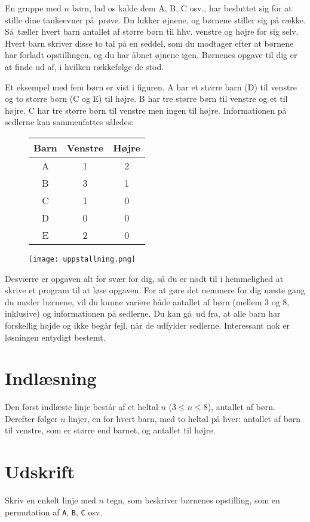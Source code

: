 En gruppe med $n$ børn, lad os kalde dem A, B, C osv., har besluttet sig for at stille dine tankeevner på prøve.
Du lukker øjnene, og børnene stiller sig på række.
Så tæller hvert barn antallet af større børn til hhv. venstre og højre for sig selv.
Hvert barn skriver disse to tal på en seddel, som du modtager efter at børnene har forladt opstillingen, og du har åbnet øjnene igen.
Børnenes opgave til dig er at finde ud af, i hvilken rækkefølge de stod.

Et eksempel med fem børn er vist i figuren.
A har et større barn (D) til venstre og to større børn (C og E) til højre.
B har tre større børn til venstre og et til højre.
C har tre større børn til venstre men ingen til højre. 
Informationen på sedlerne kan sammenfattes således:

\begin{figure}[h!]
  \centering

\begin{minipage}{.5\textwidth}
    \begin{tabular}[b]{|c|c|c|}
    \hline
      Barn&Venstre&Højre\\\hline
      A&1&2\\
      B&3&1\\
      C&1&0\\
      D&0&0\\
      E&2&0\\\hline
    \end{tabular}
\end{minipage}%
\begin{minipage}{.5\textwidth}
    \texttt{[image: uppstallning.png]}
\end{minipage}

\end{figure}

Desværre er opgaven alt for svær for dig, så du er nødt til i hemmelighed at skrive et program til at løse opgaven.
For at gøre det nemmere for dig næste gang du møder børnene, vil du kunne variere både antallet af børn (mellem $3$ og $8$, inklusive) og informationen på sedlerne.
Du kan gå ud fra, at alle barn har forskellig højde og ikke begår fejl, når de udfylder sedlerne.
Interessant nok er løsningen entydigt bestemt.

\section*{Indlæsning}
Den først indlæste linje består af et heltal $n$ ($3 \le n \le 8$), antallet af børn.
Derefter følger $n$ linjer, en for hvert barn,  med to heltal på hver: antallet af børn til venstre, som er større end barnet, og antallet til højre.

\section*{Udskrift}
Skriv en enkelt linje med $n$ tegn, som beskriver børnenes opstilling, som en permutation af \texttt{A}, \texttt{B}, \texttt{C} osv.
